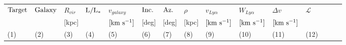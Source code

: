 \documentclass[twocolumn,tighten]{aastex6}
\newcommand{\kms}{$\rm [km ~s^{-1}]$}
\begin{document}
%



\begin{table}[ht]\footnotesize
\begin{center}
\begin{tabular}{l l l l l l l l l l l l l l l}
 \hline \hline
 $\rm Target$ & $\rm Galaxy$ & $R_{vir}$         & $\rm L/L_{\**}$ & $v_{galaxy}$    &  $\rm Inc.$          &  $\rm Az.$ 	     & $\rho$		& $v_{Ly\alpha}$	& $W_{Ly\alpha}$   & $\Delta v$  	     & $\mathcal{L}$  \\ 
  	   	     &                        & \scriptsize [kpc] &          	      & \scriptsize \kms & \scriptsize [deg] & \scriptsize [deg] & \scriptsize [kpc] & \scriptsize \kms & \scriptsize \kms & \scriptsize \kms & 		\\
\scriptsize (1) & \scriptsize (2) & \scriptsize (3) & \scriptsize (4) & \scriptsize (5)      & \scriptsize (6)     & \scriptsize  (7)   & \scriptsize (8)    & \scriptsize (9)        & \scriptsize (10)     & \scriptsize (11)    & \scriptsize (12) \\ \hline \hline


\end{tabular}
\end{center}
\end{table}
\end{document}
